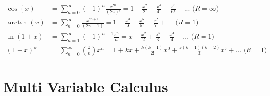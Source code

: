 \documentclass[11pt]{article}
\begin{document}
\begin{itemize}[noitemsep]
\begin{align}
		\cos (x) & = \sum_{n=0}^\infty (-1)^n \frac{x^{2n}}{(2n)!} = 1 - \frac{x^2}{2!} + \frac{x^4}{4!} - \frac{x^6}{6!} + ... \text{ ($R=\infty$) } \\
		\arctan(x) & = \sum_{n=0}^\infty \frac{x^{2n+1}}{(2n+1)} = 1 - \frac{x^3}{3} + \frac{x^5}{5!} - \frac{x^7}{7!} + ... \text{ ($R =1$)} \\
		\ln (1+x) & = \sum_{n=1}^\infty (-1)^{n-1} \frac{x^n}{n} = x - \frac{x^2}{2} + \frac{x^3}{3} - \frac{x^4}{4} + ... \text{ ($R=1$) } \\
		(1+x)^k & = \sum_{n=0}^\infty \binom{k}{n} x^n = 1 + kx + \frac{k(k-1)}{2!}x^3 + \frac{k(k-1)(k-2)}{3!}x^3 + ... \text{ ($R=1$)} 
	\end{align}

\end{itemize}

\section{Multi Variable Calculus}
\end{document}
